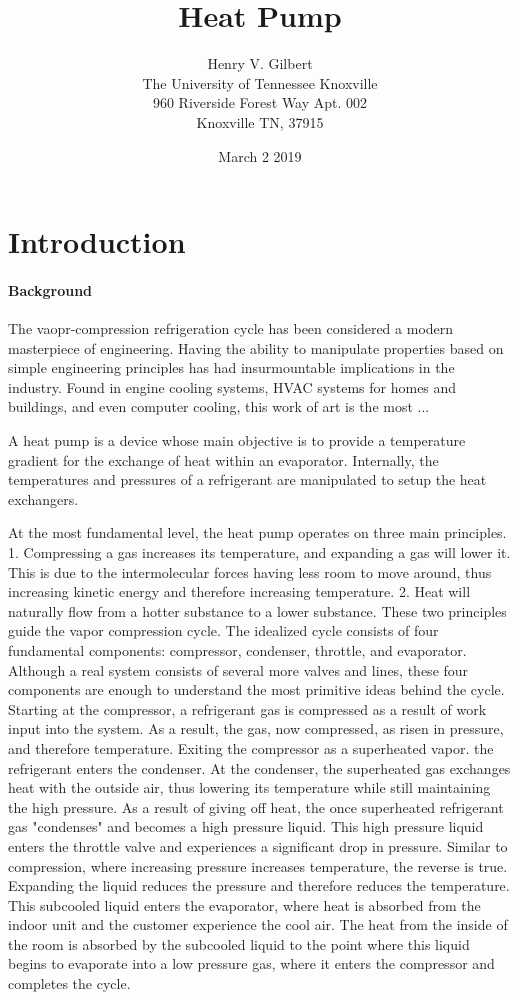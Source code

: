 \documentclass{article}
\title{Heat Pump}
\author{Henry V. Gilbert \\
	The University of Tennessee Knoxville \\
	960 Riverside Forest Way
	Apt. 002 \\
	Knoxville TN, 37915
	}
\date {March 2 2019}
\begin{document}
\maketitle



\section{Introduction}
\paragraph{Background} 
The vaopr-compression refrigeration cycle has been considered a modern masterpiece of engineering. Having the ability
to manipulate properties based on simple engineering principles has had insurmountable implications in the industry. 
Found in engine cooling systems, HVAC systems for homes and buildings, and even computer cooling, this work of 
art is the most ... 

	A heat pump is a device whose main objective is to provide a temperature gradient for the exchange of heat within
an evaporator. Internally, the temperatures and pressures of a refrigerant are manipulated to setup the heat exchangers. 
	
	At the most fundamental level, the heat pump operates on three main principles. 1. Compressing a gas increases its temperature, and expanding a gas will lower it. This is due to the intermolecular forces having less room to move around, thus increasing kinetic energy and therefore increasing temperature. 2. Heat will naturally flow from a hotter substance to a lower substance. These two principles guide the vapor compression cycle. The idealized cycle consists of four fundamental components: compressor, condenser, throttle, and evaporator. Although a real system consists of several more valves and lines, these four components are enough to understand the most primitive ideas behind the cycle. Starting at the compressor, a refrigerant gas is compressed as a result of work input into the system. As a result, the gas, now compressed, as risen in pressure, and therefore temperature. Exiting the compressor as a superheated vapor. the refrigerant enters the condenser. At the condenser, the superheated gas exchanges heat with the outside air, thus lowering its temperature while still maintaining the high pressure. As a result of giving off heat, the once superheated refrigerant gas "condenses" and becomes a high pressure liquid. This high pressure liquid enters the throttle valve and experiences a significant drop in pressure. Similar to compression, where increasing pressure increases temperature, the reverse is true. Expanding the liquid reduces the pressure and therefore reduces the temperature. This subcooled liquid enters the evaporator, where heat is absorbed from the indoor unit and the customer experience the cool air. The heat from the inside of the room is absorbed by the subcooled liquid to the point where this liquid begins to evaporate into a low pressure gas, where it enters the compressor and completes the cycle. 
	
\end{document}
